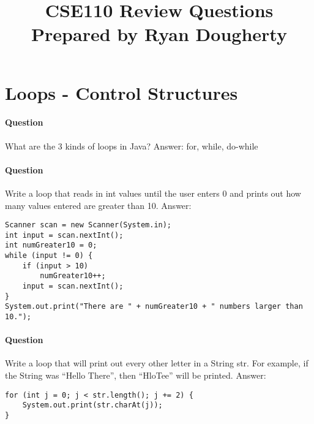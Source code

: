 \documentclass{article}
\date{}
\begin{document}
\title{\textbf{CSE110 Review Questions \\
Prepared by Ryan Dougherty}}
\maketitle

\section*{Loops - Control Structures}


\setcounter{question_num}{1}

\setcounter{question_num}{1}
\paragraph{Question }
What are the 3 kinds of loops in Java? {\color{red}Answer: for, while, do-while}

\addtocounter{question_num}{1}
\paragraph{Question }
Write a loop that reads in int values until the user enters 0 and prints out how many values entered are greater than 10.
\newline
{\color{red}Answer:}
\begin{lstlisting}
Scanner scan = new Scanner(System.in);
int input = scan.nextInt();
int numGreater10 = 0;
while (input != 0) {
	if (input > 10)
		numGreater10++;
	input = scan.nextInt();
}
System.out.print("There are " + numGreater10 + " numbers larger than 10.");
\end{lstlisting}

\addtocounter{question_num}{1}
\paragraph{Question }
Write a loop that will print out every other letter in a String str. For example, if the String was \enquote{Hello There}, then \enquote{HloTee} will be printed.
\newline
{\color{red}Answer:}
\begin{lstlisting}
for (int j = 0; j < str.length(); j += 2) {
	System.out.print(str.charAt(j));
}
\end{lstlisting}

\addtocounter{question_num}{1}
\end{document}
